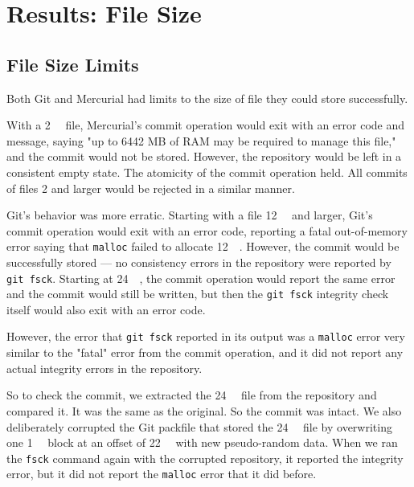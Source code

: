 
\cleardoublepage

\section{Results: File Size}
\label{file-size-results}

\subsection{File Size Limits}
\label{file-size-limits-results}

Both Git and Mercurial had limits to the size of file they could store
successfully.

With a \SI{2}{\gibi\byte} file, Mercurial's \gls{commit} operation would exit
with an error code and message, saying "up to 6442 MB of RAM may be required to
manage this file," and the \gls{commit} would not be stored. However, the
\gls{repository} would be left in a consistent empty state. The atomicity of the
\gls{commit} operation held. All commits of files \SI{2}{\gib} and larger would
be rejected in a similar manner.

Git's behavior was more erratic. Starting with a file \SI{12}{\gibi\byte} and
larger, Git's \gls{commit} operation would exit with an error code, reporting a
fatal out-of-memory error saying that
\lstinline{malloc}
failed to allocate \SI{12}{\gibi\byte}.
However, the \gls{commit} would be successfully stored --- no consistency
errors in the \gls{repository} were reported by
\lstinline{git fsck}.
Starting at \SI{24}{\gibi\byte}, the \gls{commit} operation would report the
same error and the \gls{commit} would still be written, but then the
\lstinline{git fsck}
integrity check itself would also exit with an error code.

However, the error that
\lstinline{git fsck}
reported in its output was a 
\lstinline{malloc}
error very similar to the "fatal" error from the \gls{commit} operation, and it
did not report any actual integrity errors in the \gls{repository}.

So to check the \gls{commit}, we extracted the \SI{24}{\gibi\byte} file from the
\gls{repository} and compared it. It was the same as the original. So the
\gls{commit} was intact. We also deliberately corrupted the Git \gls{packfile}
that stored the \SI{24}{\gibi\byte} file by overwriting one \SI{1}{\mebi\byte}
block at an offset of \SI{22}{\gibi\byte} with new pseudo-random data. When we
ran the \lstinline{fsck} command again with the corrupted \gls{repository}, it
reported the integrity error, but it did not report the \lstinline{malloc} error
that it did before.

